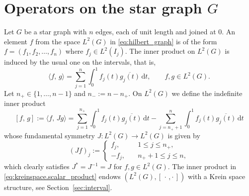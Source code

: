 \documentclass{article}
\numberwithin{equation}{section}
\theoremstyle{definition}
\newcommand{\kip}{[\,\cdot\, , \cdot\,]}
\newcommand{\rd}{\mathrm d} %
\newcommand{\scalar}[2]{\langle#1,\, #2\rangle}
\newcommand{\kscalar}[2]{[#1,\, #2]}
\newcommand{\phink}[2]{\phi_{#1,#2}}  %
\newcommand{\psink}[2]{\psi_{#1,#2}}  %
\begin{document}


\section{Operators on the star graph $G$} %

Let $G$ be a star graph with $n$ edges, each of unit length and joined at $0$. An element $f$ from the space $L^2(G)$ in  \eqref{eq:hilbert_graph} is of the form $f = (f_1, f_2, \dots, f_n)$ where $f_j \in L^2(I_j)$. The inner product on $L^2(G)$ is induced by the usual one on the intervals, that is,
\begin{equation*}
   \scalar{f}{g} = \sum_{j=1}^n \int_0^1 f_j(t) \overline{g_j(t)}\, \rd t,\qquad f, g\in   L^2(G).
\end{equation*}
Let $n_+\in \{1, \dots, n-1\}$ and $n_- := n- n_+$. 
On $L^2(G)$ we define the indefinite inner product
\begin{equation}
   \label{eq:kreinspace.scalar_product}
   \kscalar{f}{g} := \scalar{f}{Jg} = \sum_{j=1}^{n_+} \int_0^1 f_j(t) \overline{g_j(t)}\, \rd t -  \sum_{j=n_+ +1}^{n} \int_0^1 f_j(t) \overline{g_j(t)}\, \rd t
\end{equation}
whose fundamental symmetry $J: L^2(G) \to L^2(G)$ is given by
\begin{equation*}
   (Jf)_j := 
   \begin{cases}
      f_j,\quad & 1\le j \le n_+, \\[1ex]
      -f_j,\quad & n_+ + 1 \le j \le n,
   \end{cases}
\end{equation*}
which clearly satisfies $J^* = J^{-1} = J$ for $f,g \in L^2(G)$. The inner product in \eqref{eq:kreinspace.scalar_product} endows $(L^2(G),\kip)$ with a Krein space structure, see Section~\ref{sec:interval}.
\end{document}
